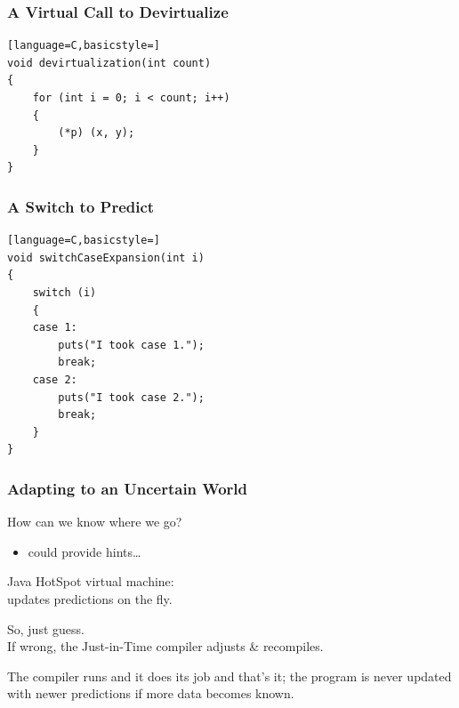 \begin{frame}[fragile]
\frametitle{A Virtual Call to Devirtualize}

\begin{changemargin}{2cm}
\begin{lstlisting}[language=C,basicstyle=]
void devirtualization(int count)
{
    for (int i = 0; i < count; i++)
    {
        (*p) (x, y);
    }
}
\end{lstlisting}
\end{changemargin}
\end{frame}

\begin{frame}[fragile]
\frametitle{A Switch to Predict}
\begin{changemargin}{2cm}
\begin{lstlisting}[language=C,basicstyle=]
void switchCaseExpansion(int i)
{
    switch (i)
    {
    case 1:
        puts("I took case 1.");
        break;
    case 2:
        puts("I took case 2.");
        break;
    }
}
\end{lstlisting}
\end{changemargin}
\end{frame}



\begin{frame}
\frametitle{Adapting to an Uncertain World}

\begin{changemargin}{2cm}
How can we know where we go?
\begin{itemize}
\item could provide hints\ldots
\end{itemize}

Java HotSpot virtual machine: \\
updates predictions on the fly. 

So, just guess.\\
If wrong, the Just-in-Time compiler adjusts \& recompiles.

The compiler runs and it does its job and that's it; the program is never updated with newer predictions if more data becomes known.
\end{changemargin}

\end{frame}



